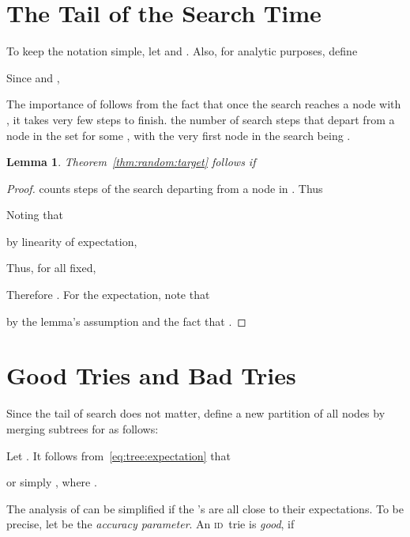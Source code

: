 \documentclass{article}
\newcommand{\id}{{\scshape id}}
\newtheorem{lemma}{Lemma}
\begin{document}
\section{The Tail of the Search Time}

To keep the notation simple, let  and .  Also, for analytic
purposes, define

Since  and , 


The importance of  follows from the fact that once the search reaches a node
 with , it takes very few steps to finish. 
the number of search steps that depart from a node in the set
 for some , with the very first node in the search being . 

\begin{lemma}
    Theorem~\ref{thm:random:target} follows if 
    
    \label{lem:tail}
\end{lemma}
\begin{proof}
     counts steps of the search departing from a node 
    in  .  Thus
    
    Noting that
    
    by linearity of expectation, 
    
    Thus, for all  fixed, 
    
    Therefore . For the expectation, note that
    
    by the lemma's assumption and the fact that .
\end{proof}

\section{Good Tries and Bad Tries}

Since the tail of search does not matter, define a new partition  of all nodes by
merging subtrees  for  as follows:

Let . It follows from~\eqref{eq:tree:expectation} that

or simply , where .

The analysis of  can be simplified if the 's are all close to their
expectations. To be precise, let  be the \emph{accuracy
parameter}. An \id\ trie is \emph{good}, if
\end{document}
